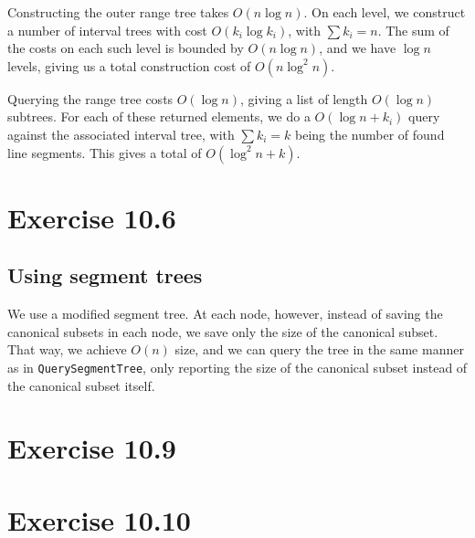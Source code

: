 \documentclass[11pt,a4paper]{article}
\begin{document}
Constructing the outer range tree takes $O(n \log n)$. On each level, we construct a
number of interval trees with cost $O(k_i \log k_i)$, with $\sum k_i = n$. The sum of
the costs on each such level is bounded by $O(n \log n)$, and we have $\log n$ levels,
giving us a total construction cost of $O(n \log^2 n)$.

Querying the range tree costs $O(\log n)$, giving a list of length $O(\log n)$
subtrees. For each of these returned elements, we do a $O(\log n + k_i)$ query
against the associated interval tree, with $\sum k_i = k$ being the number of
found line segments. This gives a total of $O(\log^2 n + k)$.

\section{Exercise 10.6}

\subsection{Using segment trees}

We use a modified segment tree. At each node, however, instead of
saving the canonical subsets in each node, we save only the size of
the canonical subset. That way, we achieve $O(n)$ size, and we can
query the tree in the same manner as in \verb+QuerySegmentTree+, only
reporting the size of the canonical subset instead of the canonical
subset itself.

\section{Exercise 10.9}

\section{Exercise 10.10}
\end{document}
